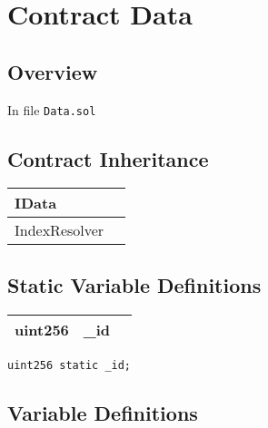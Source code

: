 
\chapter{Contract Data}

\minitoc

\section{Overview}


In file {\tt Data.sol}

\section{Contract Inheritance}


\noindent\begin{tabular}{|l|p{5cm}|}\hline
IData & \\\hline
IndexResolver & \\\hline
\end{tabular}


\section{Static Variable Definitions}


\ifsoltables
\noindent\begin{tabular}{|l|l|p{5cm}|}\hline
uint256 & \_{}id &  \\\hline
\end{tabular}
\fi


\begin{lstlisting}[firstnumber=17]
    uint256 static _id;
\end{lstlisting}

\section{Variable Definitions}


